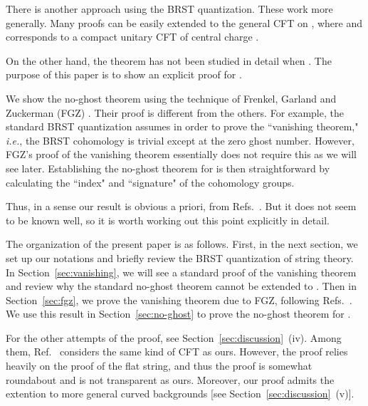 \documentclass[a4paper,12pt]{article}
\def\IR{\relax{\rm I\kern-.18em R}}
\begin{document}
There is another approach using the BRST quantization. These work more
generally. Many proofs can be easily extended to the general \coordHE{}
CFT on \myHighlight{$ \IR^{d-1,1} \times K $}\coordHE{}, where \coordHE{} and \coordHE{} corresponds to a compact unitary CFT of central charge \coordHE{}
\cite{KO,FGZ,spiegelglas,GM,Big}. 

On the other hand, the theorem has not been studied in detail when \coordHE{}. The
purpose of this paper is to show an explicit proof for \coordHE{}.

We show the no-ghost theorem using the technique of Frenkel, Garland and
Zuckerman (FGZ) \cite{FGZ}. Their proof is different from the others. For
example, the standard BRST quantization assumes \coordHE{} in order to prove
the ``vanishing theorem," {\it i.e.}, the BRST cohomology is trivial except
at the zero ghost number. However, 
FGZ's proof of the vanishing theorem essentially does not require this as we will see later.
Establishing the no-ghost theorem for \coordHE{} is then
straightforward by calculating the ``index" and ``signature" of the cohomology groups.

Thus, in a sense our result is obvious a priori, from Refs.~\cite{FGZ,LZ,FK}.
But it does not seem to be known well, so it is worth working out this point
explicitly in detail.

The organization of the present paper is as follows. First, in the next
section, we set up our notations and briefly review the BRST quantization of
string theory. In Section~\ref{sec:vanishing}, we will see a
standard proof
of the vanishing theorem and review why the standard no-ghost theorem cannot
be extended to \coordHE{}. Then in Section~\ref{sec:fgz}, we prove the
vanishing theorem due to FGZ, following Refs.~\cite{FGZ,LZ,FK}.
We use this result in Section~\ref{sec:no-ghost} to prove the no-ghost
theorem for \coordHE{}.

For the other attempts of the \coordHE{} proof, see Section~\ref{sec:discussion}~(iv). Among them, Ref.~\cite{GM} considers the same kind of CFT as ours. However, the proof relies heavily on the proof of the flat \coordHE{} string, and thus the proof is somewhat roundabout and is not transparent as ours. Moreover, our proof admits the extention to more general curved backgrounds [see Section~\ref{sec:discussion}~(v)].
\end{document}
